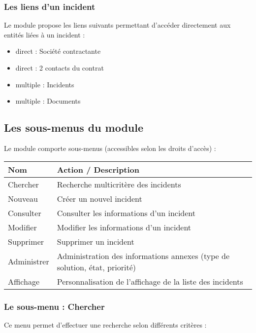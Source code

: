\subsubsection{Les liens d'un incident}

Le module \incident propose les liens suivants permettant d'accéder directement aux entités liées à un incident :\\

\begin{itemize}
\item direct : Société contractante
\item direct : 2 contacts du contrat
\item multiple : Incidents
\item multiple : Documents
\end{itemize}


\subsection{Les sous-menus du module \incident}

Le module \contract comporte  sous-menus (accessibles selon les droits d'accès) :\\

\begin{tabular}{|p{2.5cm}|p{9.5cm}|}
\hline
\textbf{Nom} & \textbf{Action / Description} \\
\hline
Chercher & Recherche multicritère des incidents \\
\hline
Nouveau & Créer un nouvel incident\\
\hline
Consulter & Consulter les informations d'un incident\\
\hline
Modifier & Modifier les informations d'un incident\\
\hline
Supprimer & Supprimer un incident\\
\hline
Administrer & Administration des informations annexes (type de solution, état, priorité)\\
\hline
Affichage & Personnalisation de l'affichage de la liste des incidents\\
\hline
\end{tabular}


\subsubsection{Le sous-menu : Chercher}

Ce menu permet d'effectuer une recherche selon différents critères :

